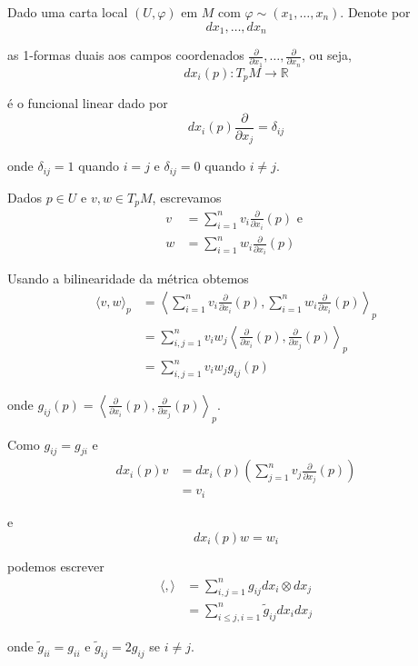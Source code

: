 \begin{obse}
	Dado uma carta local $(U, \varphi)$ em $M$ com $\varphi \sim (x_1, \ldots, x_n)$. Denote por
	\begin{equation*}
		dx_1, \ldots, dx_n
	\end{equation*}
	
	as 1-formas duais aos campos coordenados $\frac{\partial}{\partial x_1}, \ldots, \frac{\partial}{\partial x_n}$, ou seja,
	\begin{equation*}
		dx_i (p): T_p M \rightarrow \mathbb{R}
	\end{equation*}
	
	é o funcional linear dado por
	\begin{equation*}
		dx_i (p) \frac{\partial}{\partial x_j} = \delta_{ij}
	\end{equation*}
	
	onde $\delta_{ij} = 1$ quando $i=j$ e $\delta_{ij} = 0$ quando $i \neq j$. 
	
	Dados $p \in U$ e $v,w \in T_p M$, escrevamos
	\begin{align*}
		v &= \sum_{i=1}^n v_i \frac{\partial}{\partial x_i}(p) \text{ e }\\
		w &= \sum_{i=1}^n w_i \frac{\partial}{\partial x_i}(p)
	\end{align*}
	
	Usando a bilinearidade da métrica obtemos
	\begin{align*}
		\langle v,w \rangle_p &= \left\langle \sum_{i=1}^n v_i \frac{\partial}{\partial x_i}(p), \sum_{i=1}^n w_i \frac{\partial}{\partial x_i}(p) \right\rangle_p\\
		&= \sum_{i,j = 1}^n v_i w_j \left\langle \frac{\partial}{\partial x_i}(p), \frac{\partial}{\partial x_j}(p) \right\rangle_p\\
		&= \sum_{i,j=1}^n v_i w_j g_{ij}(p)
	\end{align*}
	
	onde $g_{ij}(p) = \left\langle \frac{\partial}{\partial x_i}(p), \frac{\partial}{\partial x_j}(p) \right\rangle_p$.
	
	Como $g_{ij} = g_{ji}$ e
	\begin{align*}
		dx_i (p) v &= dx_i (p) \left( \sum_{j=1}^n v_j \frac{\partial}{\partial x_j}(p) \right)\\
		&= v_i
	\end{align*}
	
	e
	\begin{equation*}
		dx_i (p) w = w_i
	\end{equation*}
	
	podemos escrever
	\begin{align*}
		\langle , \rangle &= \sum_{i,j=1}^n g_{ij} dx_i \otimes dx_j\\
		&= \sum_{i \leq j, i=1}^n \tilde{g}_{ij} dx_i dx_j
	\end{align*}
	
	onde $\tilde{g}_{ii} = g_{ii} $ e $\tilde{g}_{ij} = 2g_{ij}$ se $i \neq j$.
\end{obse}

